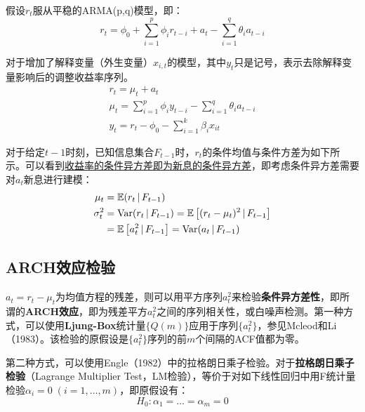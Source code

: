 \documentclass[11pt]{article}
\begin{document}
假设$r_t$服从平稳的ARMA(p,q)模型，即：
\begin{equation*}
    r_t = \phi_0 + \sum_{i=1}^{p} \phi_i r_{t-i} + a_t - \sum_{i=1}^{q} \theta_i a_{t-i}
\end{equation*}

对于增加了解释变量（外生变量）$x_{i,t}$的模型，其中$y_t$只是记号，表示去除解释变量影响后的调整收益率序列。
\begin{gather*}
    r_t=\mu_t + a_t \\
    \mu_t = \sum_{i=1}^{p} \phi_i y_{t-i} - \sum_{i=1}^{q} \theta_i a_{t-i} \\
    y_t = r_t - \phi_0 - \sum_{i=1}^{k} \beta_i x_{it}
\end{gather*}

对于给定$t-1$时刻，已知信息集合$F_{t-1}$时，$r_t$的条件均值与条件方差为如下所示。可以看到\uline{收益率的条件异方差即为新息的条件异方差}，即考虑条件异方差需要对$a_t$新息进行建模：
\begin{align*}
    \mu_t &= \mathbb{E}(r_t \,\vert\, F_{t-1}) \\
    \sigma_{t}^{2} &= \operatorname{Var}(r_t \,\vert\, F_{t-1})
    = \mathbb{E} \left[ (r_t - \mu_t)^2 \,\vert\, F_{t-1} \right] \\
    &= \mathbb{E} \left[ a_{t}^{2} \,\vert\, F_{t-1} \right]
    = \operatorname{Var}(a_t \,\vert\, F_{t-1})
\end{align*}


\subsection{ARCH效应检验}

$a_t = r_t - \mu_t$为均值方程的残差，则可以用平方序列$a_t^2$来检验\textbf{条件异方差性}，即所谓的\textbf{ARCH效应}，即为残差平方$a_t^2$之间的序列相关性，或白噪声检测。第一种方式，可以使用\textbf{Ljung-Box}统计量$\{Q(m)\}$应用于序列$\{a_t^2\}$，参见Mcleod和Li（1983）。该检验的原假设是$\{a_t^2\}$序列的前$m$个间隔的ACF值都为零。

第二种方式，可以使用Engle（1982）中的拉格朗日乘子检验。对于\textbf{拉格朗日乘子检验}（Lagrange Multiplier Test，LM检验），等价于对如下线性回归中用F统计量检验$\alpha_i=0\;(i=1,\dots,m)$，即原假设有：
\begin{equation*}
    H_0: \alpha_1 = \dots = \alpha_m = 0
\end{equation*}
\end{document}
